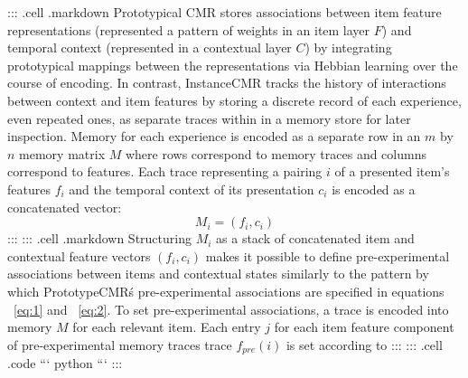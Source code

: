{}::: {.cell .markdown} Prototypical CMR stores associations between item feature representations (represented a pattern of weights in an item layer $F$) and temporal context (represented in a contextual layer $C$) by integrating prototypical mappings between the representations via Hebbian learning over the course of encoding. In contrast, InstanceCMR tracks the history of interactions between context and item features by storing a discrete record of each experience, even repeated ones, as separate traces within in a memory store for later inspection. Memory for each experience is encoded as a separate row in an $m$ by $n$ memory matrix $M$ where rows correspond to memory traces and columns correspond to features. Each trace representing a pairing $i$ of a presented item's features $f_i$ and the temporal context of its presentation $c_i$ is encoded as a concatenated vector:\markdownRendererInterblockSeparator
{}\begin{equation} \label{eq:14}M_i = (f_i, c_i)\end{equation} :::\markdownRendererInterblockSeparator
{}::: {.cell .markdown}\markdownRendererInterblockSeparator
{}\markdownRendererInterblockSeparator
{}Structuring $M_i$ as a stack of concatenated item and contextual feature vectors $(f_i, c_i)$ makes it possible to define pre-experimental associations between items and contextual states similarly to the pattern by which PrototypeCMR\'s pre-experimental associations are specified in equations ~\ref{eq:1} and ~\ref{eq:2}. To set pre-experimental associations, a trace is encoded into memory $M$ for each relevant item. Each entry $j$ for each item feature component of pre-experimental memory traces trace $f_{pre}(i)$ is set according to :::\markdownRendererInterblockSeparator
{}::: {.cell .code} ``` python ``` :::\relax